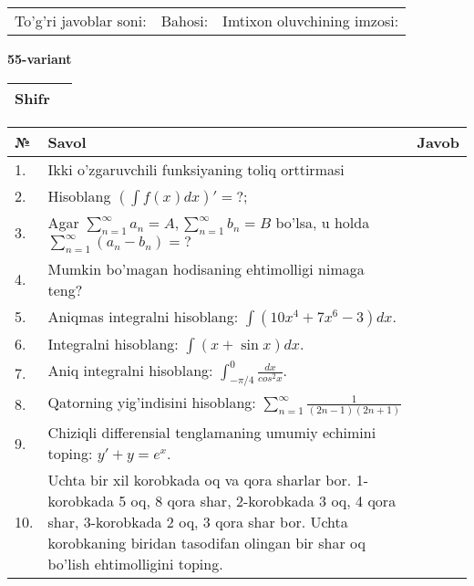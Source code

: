 \documentclass{article}
\begin{document}
  \vspace{1cm}
  
  \begin{tabular}{lll}
  To'g'ri javoblar soni: \underline{\hspace{1.5cm}} & 
  Bahosi: \underline{\hspace{1.5cm}} & 
  Imtixon oluvchining imzosi: \underline{\hspace{2cm}} \\
  \end{tabular}
  
  \egroup
  
  \newpage
  
  
  \textbf{55-variant}\\
  
  \bgroup
  \def\arraystretch{1.6} %
  
  \begin{tabular}{|m{5.7cm}|m{9.5cm}|}
  \hline
  Shifr & \\
  \hline
  \end{tabular}
  
  \vspace{1cm}
  
  \begin{tabular}{|m{0.7cm}|m{10cm}|m{4cm}|}
  \hline
  № & Savol & Javob \\
  \hline
  1. & Ikki o'zgaruvchili funksiyaning toliq orttirmasi &  \\
  \hline
  2. & Hisoblang \(\left( \int {f(x)dx} \right)' = ?\); &  \\
  \hline
  3. & Agar \(\sum_{n = 1}^{\infty}a_{n} = A,\sum_{n = 1}^{\infty}b_{n} = B\) bo'lsa, u holda \(\sum_{n = 1}^{\infty}\left( a_{n} - b_{n} \right) = ?\) &  \\
  \hline
  4. & Mumkin bo'magan hodisaning ehtimolligi nimaga teng? &  \\
  \hline
  5. & Aniqmas integralni hisoblang: \(\int {\left( 10x^{4} + 7x^{6} - 3 \right)dx}\). &  \\
  \hline
  6. & Integralni hisoblang: \(\int {(x + \sin x)dx}\). &  \\
  \hline
  7. & Aniq integralni hisoblang: \(\int_{- \pi/4}^{0}\frac{dx}{cos^{2}x}\). &  \\
  \hline
  8. & Qatorning yig'indisini hisoblang: \(\sum_{n = 1}^{\infty}\frac{1}{(2n - 1)(2n + 1)}\) &  \\
  \hline
  9. & Chiziqli differensial tenglamaning umumiy echimini toping: \(y' + y = e^{x}\). &  \\
  \hline
  10. & Uchta bir xil korobkada oq va qora sharlar bor. 1-korobkada 5 oq, 8 qora shar, 2-korobkada 3 oq, 4 qora shar, 3-korobkada 2 oq, 3 qora shar bor. Uchta korobkaning biridan tasodifan olingan bir shar oq bo'lish ehtimolligini toping. &  \\
  \hline
  \end{tabular}
  
\end{document}
